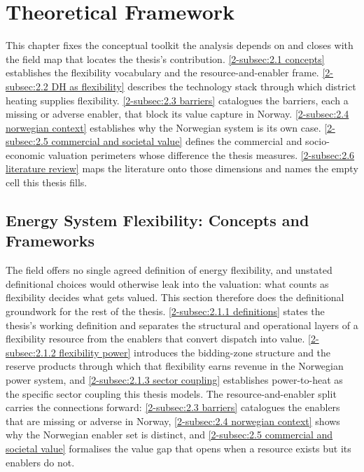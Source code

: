 \section{Theoretical Framework}
\label{2-sec:2}

This chapter fixes the conceptual toolkit the analysis depends on and closes with the field map that locates the thesis's contribution. \autoref{2-subsec:2.1 concepts} establishes the flexibility vocabulary and the resource-and-enabler frame. \autoref{2-subsec:2.2 DH as flexibility} describes the technology stack through which district heating supplies flexibility. \autoref{2-subsec:2.3 barriers} catalogues the barriers, each a missing or adverse enabler, that block its value capture in Norway. \autoref{2-subsec:2.4 norwegian context} establishes why the Norwegian system is its own case. \autoref{2-subsec:2.5 commercial and societal value} defines the commercial and socio-economic valuation perimeters whose difference the thesis measures. \autoref{2-subsec:2.6 literature review} maps the literature onto those dimensions and names the empty cell this thesis fills. 

\subsection{Energy System Flexibility: Concepts and Frameworks}
\label{2-subsec:2.1 concepts}

The field offers no single agreed definition of energy flexibility, and unstated definitional choices would otherwise leak into the valuation: what counts as flexibility decides what gets valued. This section therefore does the definitional groundwork for the rest of the thesis. \autoref{2-subsec:2.1.1 definitions} states the thesis's working definition and separates the structural and operational layers of a flexibility resource from the enablers that convert dispatch into value. \autoref{2-subsec:2.1.2 flexibility power} introduces the bidding-zone structure and the reserve products through which that flexibility earns revenue in the Norwegian power system, and \autoref{2-subsec:2.1.3 sector coupling} establishes power-to-heat as the specific sector coupling this thesis models. The resource-and-enabler split carries the connections forward: \autoref{2-subsec:2.3 barriers} catalogues the enablers that are missing or adverse in Norway, \autoref{2-subsec:2.4 norwegian context} shows why the Norwegian enabler set is distinct, and \autoref{2-subsec:2.5 commercial and societal value} formalises the value gap that opens when a resource exists but its enablers do not.

